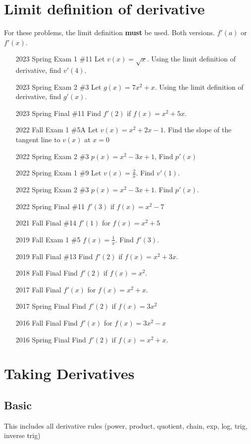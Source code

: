 \documentclass[10pt]{scrartcl}
\theoremstyle{definition}
\begin{document}
\section{Limit definition of derivative}
For these problems, the limit definition \textbf{must} be used.
Both versions. $f'(a)$ or $f'(x)$.
\begin{enumerate}
\item [2023 Spring Exam 1 \#11] Let $v(x) = \sqrt{x}$. Using the limit definition of derivative, find $v'(4)$.
\item [2023 Spring Exam 2 \#3] Let $g(x) = 7x^2 + x$. Using the limit definition of derivative, find $g'(x)$.
\item [2023 Spring Final \#11] Find $f'(2)$ if $f(x) = x^2+5x$.
\item [2022 Fall Exam 1 \#5A] Let $v(x) = x^2+2x-1$. Find the slope of the tangent line to $v(x)$ at $x=0$
\item [2022 Spring Exam 2 \#3] $p(x) = x^2-3x+1$, Find $p'(x)$
\item [2022 Spring Exam 1 \#9] Let $v(x) = \frac2x$. Find $v'(1)$.
\item [2022 Spring Exam 2 \#3] $p(x) = x^2-3x+1$. Find $p'(x)$.
\item [2022 Spring Final \#11] $f'(3)$ if $f(x) = x^2-7$
\item [2021 Fall Final \#14] $f'(1)$ for $f(x) = x^2+5$
\item [2019 Fall Exam 1 \#5] $f(x) = \frac1x$. Find $f'(3)$.
\item [2019 Fall Final \#13] Find $f'(2)$ if $f(x) = x^2+3x$.
\item [2018 Fall Final] Find $f'(2)$ if $f(x) = x^2$.
\item [2017 Fall Final] $f'(x)$ for $f(x) = x^2 + x$.
\item [2017 Spring Final] Find $f'(2)$ if $f(x) = 3x^2$
\item [2016 Fall Final] Find $f'(x)$ for $f(x) = 3x^2 - x$
\item [2016 Spring Final] Find $f'(2)$ if $f(x) = x^2 + x$.
\end{enumerate}

\section{Taking Derivatives}

\subsection{Basic}
This includes all derivative rules (power, product, quotient, chain, exp, log, trig, inverse trig)
\end{document}
